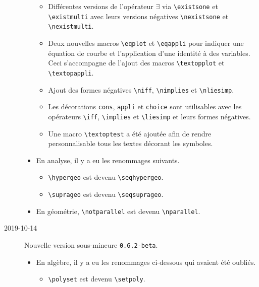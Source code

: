 \documentclass[12pt,a4paper]{article}
\newcommand\env[1]{\texttt{#1}}
\newcommand\macro[1]{\env{\textbackslash{}#1}}
\theoremstyle{definition}
\begin{document}
\begin{description}
\begin{itemize}[itemsep=.5em]
\begin{itemize}[itemsep=.5em]
            \item Différentes versions de l'opérateur $\exists$ via \macro{existsone} et \macro{existmulti} avec leurs versions négatives \macro{nexistsone} et \macro{nexistmulti}.
    
            \item Deux nouvelles macros \macro{eqplot} et \macro{eqappli} pour indiquer une équation de courbe et l'application d'une identité à des variables. Ceci s'accompagne de l'ajout des macros \macro{textopplot} et \macro{textopappli}.
    
            \item Ajout des formes négatives \macro{niff}, \macro{nimplies} et \macro{nliesimp}.
    
            \item Les décorations \verb+cons+, \verb+appli+ et \verb+choice+ sont utilisables avec les opérateurs \macro{iff}, \macro{implies} et \macro{liesimp} et leurs formes négatives.
    
            \item Une macro \macro{textoptest} a été ajoutée afin de rendre personnalisable tous les textes décorant les symboles.
        \end{itemize}
    
    
        \item En analyse, il y a eu les renommages suivants.
        \begin{itemize}[itemsep=.5em]
            \item \macro{hypergeo} est devenu \macro{seqhypergeo}.
    
            \item \macro{suprageo} est devenu \macro{seqsuprageo}.
        \end{itemize}
    
    
        \item En géométrie, \macro{notparallel} est devenu \macro{nparallel}.
    \end{itemize}


    \medskip
    \item[2019-10-14] Nouvelle version sous-mineure \verb+0.6.2-beta+.
    
    \begin{itemize}[itemsep=.5em]
        \item En algèbre, il y a eu les renommages ci-dessous qui avaient été oubliés.
        \begin{itemize}[itemsep=.5em]
            \item \macro{polyset} est devenu \macro{setpoly}.
    

\end{itemize}
\end{itemize}
\end{description}
\end{document}
